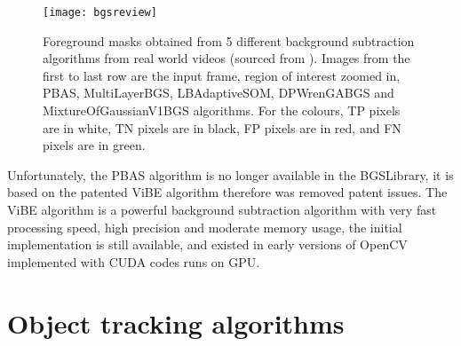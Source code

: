 \begin{figure}[tbh]
  \centering
  \texttt{[image: bgsreview]}
  \caption{Foreground masks obtained from 5 different background subtraction algorithms from real world videos (sourced from \cite{bgs:article}). Images from the first to last row are the input frame, region of interest zoomed in, PBAS, MultiLayerBGS, LBAdaptiveSOM, DPWrenGABGS and MixtureOfGaussianV1BGS algorithms. For the colours, TP pixels are in white, TN pixels are in black, FP pixels are in red, and FN pixels are in green.}
  \label{bgsreview}
\end{figure}

Unfortunately, the PBAS algorithm is no longer available in the BGSLibrary, it is based on the patented ViBE algorithm \cite{barnich2011vibe} therefore was removed  patent issues. The ViBE algorithm is a powerful background subtraction algorithm with very fast processing speed, high precision and moderate memory usage, the initial implementation is still available, and existed in early versions of OpenCV implemented with CUDA codes runs on GPU.

\iffalse
\subsection{Optical flow}

Optical flow is another widely used object tracking algorithm, it can be used for detect moving objects as well.

There are 2 types of optical flow algorithms. One is sparse feature set (Lucas-Kanade method \cite{bouguet2001pyramidal}), it evaluates pixel movements around selected feature points, therefore calculates movements of feature points. Another type is dense optical flow (Gunner Farneback's algorithm \cite{farneback2003two}), it evaluates pixel movements for all pixels in the frame.

{\color{red}More descriptions and images?}

By rendering pixel movements in 3 axes computed from dense optical flow as 3 components (RGB) colours, then find out regions with the same colour, sizes and positions of moving objects in the scene can then be determined. However, once an object stopped moving, the optical flow algorithms cannot distinguish the object from background any longer.
\fi

\section{Object tracking algorithms}
\label{bg:tracking}

